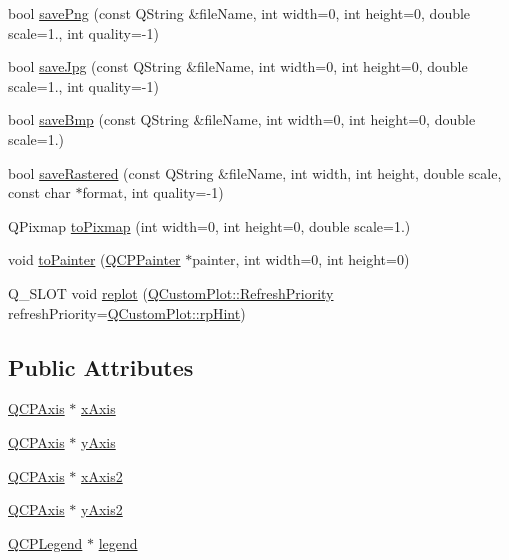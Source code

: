 \begin{DoxyCompactItemize}
\item 
bool \hyperlink{classQCustomPlot_a7636261aff1f6d25c9da749ece3fc8b8}{save\-Png} (const \-Q\-String \&file\-Name, int width=0, int height=0, double scale=1., int quality=-\/1)
\item 
bool \hyperlink{classQCustomPlot_a490c722092d1771e8ce4a7a73dfd84ab}{save\-Jpg} (const \-Q\-String \&file\-Name, int width=0, int height=0, double scale=1., int quality=-\/1)
\item 
bool \hyperlink{classQCustomPlot_a6629d9e8e6da4bf18055ee0257fdce9a}{save\-Bmp} (const \-Q\-String \&file\-Name, int width=0, int height=0, double scale=1.)
\item 
bool \hyperlink{classQCustomPlot_ab528b84cf92baabe29b1d0ef2f77c93e}{save\-Rastered} (const \-Q\-String \&file\-Name, int width, int height, double scale, const char $\ast$format, int quality=-\/1)
\item 
\-Q\-Pixmap \hyperlink{classQCustomPlot_aabb974d71ce96c137dc04eb6eab844fe}{to\-Pixmap} (int width=0, int height=0, double scale=1.)
\item 
void \hyperlink{classQCustomPlot_a1be68d5c0f1e086d6374d1340a193fb9}{to\-Painter} (\hyperlink{classQCPPainter}{\-Q\-C\-P\-Painter} $\ast$painter, int width=0, int height=0)
\item 
\-Q\-\_\-\-S\-L\-O\-T void \hyperlink{classQCustomPlot_a606fd384b2a637ce2c24899bcbde77d6}{replot} (\hyperlink{classQCustomPlot_a45d61392d13042e712a956d27762aa39}{\-Q\-Custom\-Plot\-::\-Refresh\-Priority} refresh\-Priority=\hyperlink{classQCustomPlot_a45d61392d13042e712a956d27762aa39adfa1f2387617168d9299f4c8ad15b332}{\-Q\-Custom\-Plot\-::rp\-Hint})
\end{DoxyCompactItemize}
\subsection*{\-Public \-Attributes}
\begin{DoxyCompactItemize}
\item 
\hyperlink{classQCPAxis}{\-Q\-C\-P\-Axis} $\ast$ \hyperlink{classQCustomPlot_a9a79cd0158a4c7f30cbc702f0fd800e4}{x\-Axis}
\item 
\hyperlink{classQCPAxis}{\-Q\-C\-P\-Axis} $\ast$ \hyperlink{classQCustomPlot_af6fea5679725b152c14facd920b19367}{y\-Axis}
\item 
\hyperlink{classQCPAxis}{\-Q\-C\-P\-Axis} $\ast$ \hyperlink{classQCustomPlot_ada41599f22cad901c030f3dcbdd82fd9}{x\-Axis2}
\item 
\hyperlink{classQCPAxis}{\-Q\-C\-P\-Axis} $\ast$ \hyperlink{classQCustomPlot_af13fdc5bce7d0fabd640f13ba805c0b7}{y\-Axis2}
\item 
\hyperlink{classQCPLegend}{\-Q\-C\-P\-Legend} $\ast$ \hyperlink{classQCustomPlot_a4eadcd237dc6a09938b68b16877fa6af}{legend}
\end{DoxyCompactItemize}
